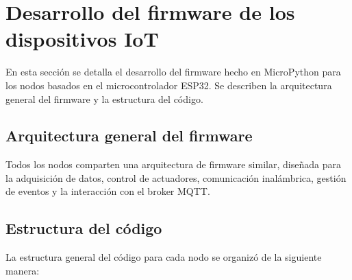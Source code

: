 \section{Desarrollo del firmware de los dispositivos IoT}

En esta sección se detalla el desarrollo del firmware hecho en MicroPython para
los nodos basados en el microcontrolador ESP32. Se describen la arquitectura
general del firmware y la estructura del código.

\subsection{Arquitectura general del firmware}

Todos los nodos comparten una arquitectura de firmware similar, diseñada para
la adquisición de datos, control de actuadores, comunicación inalámbrica,
gestión de eventos y la interacción con el broker MQTT.

\subsection{Estructura del código}

La estructura general del código para cada nodo se organizó de la siguiente
manera:

